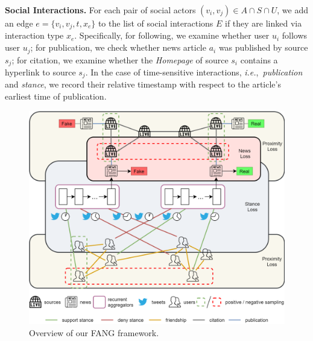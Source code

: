 \documentclass[sigconf]{acmart}
\theoremstyle{definition}
\theoremstyle{hypothesis}
\begin{document}
\textbf{Social Interactions.} For each pair of social actors $(v_i, v_j)\in A\cap S\cap U$, we add an edge $e=\{v_i, v_j, t, x_e\}$ to the list of social interactions $E$ if they are linked via interaction type $x_e$. Specifically, for following, we examine whether user $u_i$ follows user $u_j$; for publication, we check whether news article $a_i$ was published by source $s_j$; for citation, we examine whether the \emph{Homepage} of source $s_i$ contains a hyperlink to source $s_j$. In the case of time-sensitive interactions, \textit{i.e.},~\textit{publication} and \textit{stance}, we record their relative timestamp with respect to the article's earliest time of publication.

\begin{figure}[t]
\centering
\includegraphics[scale=0.18]{fang.png}
\caption{Overview of our FANG framework.}
\label{fig:fang_overview}
\end{figure}
\end{document}
